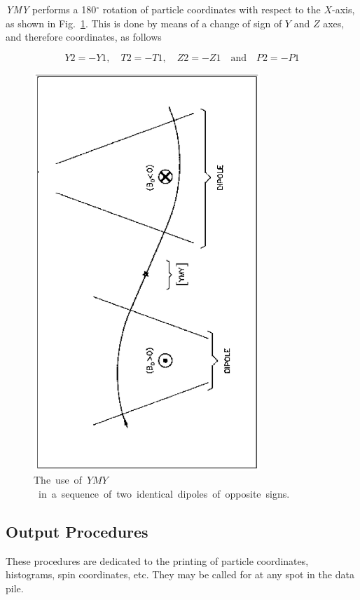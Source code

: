 \textsl{YMY}  performs a 180$^\circ$ rotation of particle coordinates with respect to the 
$ X $-axis, as shown  in Fig.~\ref{fig33}. 
This is done by means of a change of sign of $ Y $ and $ Z $ axes,  
and therefore coordinates, as follows 

$$ Y2=-Y1,\quad T2=-T1,\quad Z2=-Z1 \quad \text{and} \quad P2=-P1 $$

\vfill
\begin{figure}[H]
\centerline{\includegraphics[height=15cm,angle=-90]{Fig33.ps}}
\caption{\label{fig33}\mbox{The use of $ YMY $ in a sequence of two identical
dipoles of opposite signs.}}
\end{figure}
\vfill






\newpage  %

\subsection{Output Procedures} \label{sec4.5}

 These procedures are dedicated to the printing of particle coordinates, 
histograms, spin coordinates, etc. They may be called for at any spot in the data pile. 





